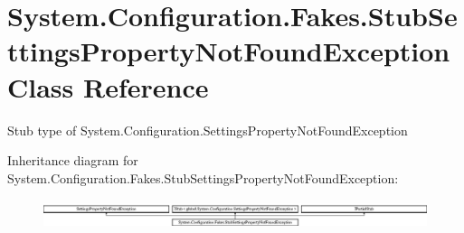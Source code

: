 \hypertarget{class_system_1_1_configuration_1_1_fakes_1_1_stub_settings_property_not_found_exception}{\section{System.\-Configuration.\-Fakes.\-Stub\-Settings\-Property\-Not\-Found\-Exception Class Reference}
\label{class_system_1_1_configuration_1_1_fakes_1_1_stub_settings_property_not_found_exception}
}


Stub type of System.\-Configuration.\-Settings\-Property\-Not\-Found\-Exception 


Inheritance diagram for System.\-Configuration.\-Fakes.\-Stub\-Settings\-Property\-Not\-Found\-Exception\-:\begin{figure}[H]
\begin{center}
\leavevmode
\includegraphics[height=0.854310cm]{class_system_1_1_configuration_1_1_fakes_1_1_stub_settings_property_not_found_exception}
\end{center}
\end{figure}
